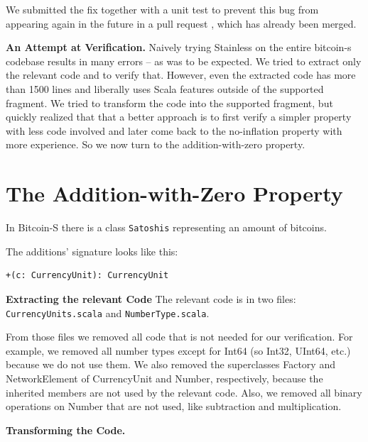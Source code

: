 \documentclass[runningheads]{llncs}
\renewcommand{\paragraph}{\textbf}%
\begin{document}
We submitted the fix together with a unit test to prevent this bug
from appearing again in the future in a pull request
\cite{BitcoinS:pull435}, which has already been merged.


\paragraph{An Attempt at Verification.} Naively trying Stainless on
the entire bitcoin-s codebase results in many errors -- as was to be
expected. We tried to extract only the relevant code and to verify
that. However, even the extracted code has more than 1500 lines and
liberally uses Scala features outside of the supported fragment.  We
tried to transform the code into the supported fragment, but quickly
realized that that a better approach is to first verify a simpler
property with less code involved and later come back to the
no-inflation property with more experience. So we now turn to the
addition-with-zero property.




\section{The Addition-with-Zero Property}


In Bitcoin-S there is a class \texttt{Satoshis} representing an amount of bitcoins.

The additions' signature looks like this:
\begin{lstlisting}[style=scala]
  +(c: CurrencyUnit): CurrencyUnit
\end{lstlisting}


\paragraph{Extracting the relevant Code} The relevant code is in two
files: \texttt{CurrencyUnits.scala} and \texttt{NumberType.scala}.

From those files we removed all code that is not needed for our
verification. For example, we removed all number types except for
Int64 (so Int32, UInt64, etc.) because we do not use them. We also
removed the superclasses Factory and NetworkElement of CurrencyUnit
and Number, respectively, because the inherited members are not used by
the relevant code. Also, we removed all binary operations on Number
that are not used, like subtraction and multiplication. 


\paragraph{Transforming the Code.}
\end{document}
